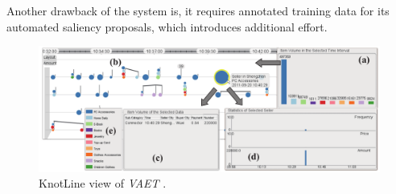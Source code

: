 \documentclass[electronic]{vgtc}             %
\begin{document}
Another drawback of the system is, it requires annotated training data for its automated saliency proposals, which introduces additional effort.

\begin{figure}[tb]
	\centering
	\includegraphics[width=\columnwidth]{KnotLines}
	\caption{KnotLine view of \textit{VAET}  \cite{Xie:2014}. 
	}
	\label{fig:knotlines}
\end{figure}
\end{document}
